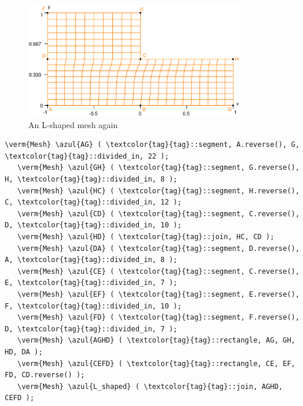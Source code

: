 \begin{figure}[ht] \centering
  \includegraphics[width=95mm]{L-shaped-distorted}
  \caption{An L-shaped mesh again}
  \label{\numb section 2.\numb fig 1}
\end{figure}

\begin{Verbatim}[commandchars=\\\{\},formatcom=\small\tt,frame=single,
   label=parag-\ref{\numb section 2.\numb parag 1}.cpp,rulecolor=\color{coment},
   baselinestretch=0.94,framesep=2mm]
   \verm{Mesh} \azul{AG} ( \textcolor{tag}{tag}::segment, A.reverse(), G, \textcolor{tag}{tag}::divided_in, 22 );
   \verm{Mesh} \azul{GH} ( \textcolor{tag}{tag}::segment, G.reverse(), H, \textcolor{tag}{tag}::divided_in, 8 );
   \verm{Mesh} \azul{HC} ( \textcolor{tag}{tag}::segment, H.reverse(), C, \textcolor{tag}{tag}::divided_in, 12 );
   \verm{Mesh} \azul{CD} ( \textcolor{tag}{tag}::segment, C.reverse(), D, \textcolor{tag}{tag}::divided_in, 10 );
   \verm{Mesh} \azul{HD} ( \textcolor{tag}{tag}::join, HC, CD );
   \verm{Mesh} \azul{DA} ( \textcolor{tag}{tag}::segment, D.reverse(), A, \textcolor{tag}{tag}::divided_in, 8 );
   \verm{Mesh} \azul{CE} ( \textcolor{tag}{tag}::segment, C.reverse(), E, \textcolor{tag}{tag}::divided_in, 7 );
   \verm{Mesh} \azul{EF} ( \textcolor{tag}{tag}::segment, E.reverse(), F, \textcolor{tag}{tag}::divided_in, 10 );
   \verm{Mesh} \azul{FD} ( \textcolor{tag}{tag}::segment, F.reverse(), D, \textcolor{tag}{tag}::divided_in, 7 );
   \verm{Mesh} \azul{AGHD} ( \textcolor{tag}{tag}::rectangle, AG, GH, HD, DA );
   \verm{Mesh} \azul{CEFD} ( \textcolor{tag}{tag}::rectangle, CE, EF, FD, CD.reverse() );
   \verm{Mesh} \azul{L_shaped} ( \textcolor{tag}{tag}::join, AGHD, CEFD );
\end{Verbatim}

